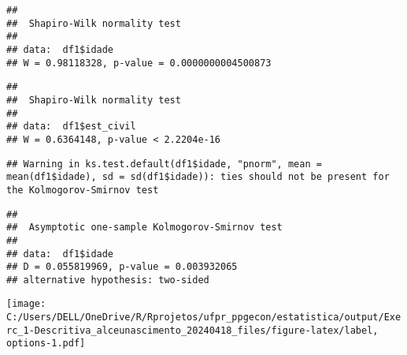 \documentclass[
]{article}
\newenvironment{Shaded}{\begin{snugshade}}{\end{snugshade}}
\newcommand{\AttributeTok}[1]{\textcolor[rgb]{0.13,0.29,0.53}{#1}}
\newcommand{\FunctionTok}[1]{\textcolor[rgb]{0.13,0.29,0.53}{\textbf{#1}}}
\newcommand{\NormalTok}[1]{#1}
\newcommand{\SpecialCharTok}[1]{\textcolor[rgb]{0.81,0.36,0.00}{\textbf{#1}}}
\newcommand{\StringTok}[1]{\textcolor[rgb]{0.31,0.60,0.02}{#1}}
\begin{document}
\begin{verbatim}
## 
##  Shapiro-Wilk normality test
## 
## data:  df1$idade
## W = 0.98118328, p-value = 0.0000000004500873
\end{verbatim}

\begin{Shaded}
\end{Shaded}

\begin{verbatim}
## 
##  Shapiro-Wilk normality test
## 
## data:  df1$est_civil
## W = 0.6364148, p-value < 2.2204e-16
\end{verbatim}

\begin{Shaded}
\end{Shaded}

\begin{verbatim}
## Warning in ks.test.default(df1$idade, "pnorm", mean = mean(df1$idade), sd = sd(df1$idade)): ties should not be present for the Kolmogorov-Smirnov test
\end{verbatim}

\begin{verbatim}
## 
##  Asymptotic one-sample Kolmogorov-Smirnov test
## 
## data:  df1$idade
## D = 0.055819969, p-value = 0.003932065
## alternative hypothesis: two-sided
\end{verbatim}

\begin{Shaded}
\end{Shaded}

\texttt{[image: C:/Users/DELL/OneDrive/R/Rprojetos/ufpr\_ppgecon/estatistica/output/Exerc\_1-Descritiva\_alceunascimento\_20240418\_files/figure-latex/label, options-1.pdf]}
\end{document}

